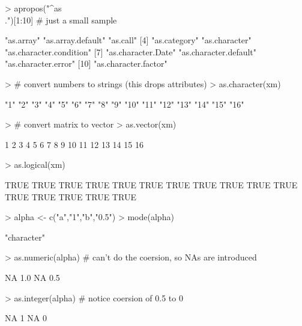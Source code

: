 \begin{Schunk}
\begin{Sinput}
> apropos("^as\\.")[1:10]      # just a small sample
\end{Sinput}
\begin{Soutput}
 [1] "as.array"               "as.array.default"       "as.call"               
 [4] "as.category"            "as.character"           "as.character.condition"
 [7] "as.character.Date"      "as.character.default"   "as.character.error"    
[10] "as.character.factor"   
\end{Soutput}
\begin{Sinput}
> # convert numbers to strings (this drops attributes)
> as.character(xm)             
\end{Sinput}
\begin{Soutput}
 [1] "1"  "2"  "3"  "4"  "5"  "6"  "7"  "8"  "9"  "10" "11" "12" "13" "14" "15" "16"
\end{Soutput}
\begin{Sinput}
> # convert matrix to vector
> as.vector(xm)
\end{Sinput}
\begin{Soutput}
 [1]  1  2  3  4  5  6  7  8  9 10 11 12 13 14 15 16
\end{Soutput}
\begin{Sinput}
> as.logical(xm)
\end{Sinput}
\begin{Soutput}
 [1] TRUE TRUE TRUE TRUE TRUE TRUE TRUE TRUE TRUE TRUE TRUE TRUE TRUE TRUE TRUE TRUE
\end{Soutput}
\begin{Sinput}
> alpha <- c("a","1","b","0.5")    
> mode(alpha)
\end{Sinput}
\begin{Soutput}
[1] "character"
\end{Soutput}
\begin{Sinput}
> as.numeric(alpha)      # can't do the coersion, so NAs are introduced
\end{Sinput}
\begin{Soutput}
[1]  NA 1.0  NA 0.5
\end{Soutput}
\begin{Sinput}
> as.integer(alpha)      # notice coersion of 0.5 to 0
\end{Sinput}
\begin{Soutput}
[1] NA  1 NA  0
\end{Soutput}
\end{Schunk}

